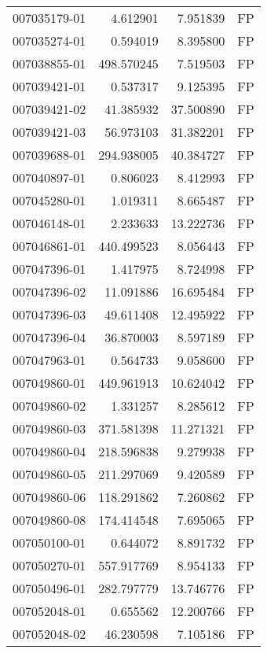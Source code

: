 \begin{tabular}{lrrl}
007035179-01 &    4.612901 &       7.951839 &   FP \\
007035274-01 &    0.594019 &       8.395800 &   FP \\
007038855-01 &  498.570245 &       7.519503 &   FP \\
007039421-01 &    0.537317 &       9.125395 &   FP \\
007039421-02 &   41.385932 &      37.500890 &   FP \\
007039421-03 &   56.973103 &      31.382201 &   FP \\
007039688-01 &  294.938005 &      40.384727 &   FP \\
007040897-01 &    0.806023 &       8.412993 &   FP \\
007045280-01 &    1.019311 &       8.665487 &   FP \\
007046148-01 &    2.233633 &      13.222736 &   FP \\
007046861-01 &  440.499523 &       8.056443 &   FP \\
007047396-01 &    1.417975 &       8.724998 &   FP \\
007047396-02 &   11.091886 &      16.695484 &   FP \\
007047396-03 &   49.611408 &      12.495922 &   FP \\
007047396-04 &   36.870003 &       8.597189 &   FP \\
007047963-01 &    0.564733 &       9.058600 &   FP \\
007049860-01 &  449.961913 &      10.624042 &   FP \\
007049860-02 &    1.331257 &       8.285612 &   FP \\
007049860-03 &  371.581398 &      11.271321 &   FP \\
007049860-04 &  218.596838 &       9.279938 &   FP \\
007049860-05 &  211.297069 &       9.420589 &   FP \\
007049860-06 &  118.291862 &       7.260862 &   FP \\
007049860-08 &  174.414548 &       7.695065 &   FP \\
007050100-01 &    0.644072 &       8.891732 &   FP \\
007050270-01 &  557.917769 &       8.954133 &   FP \\
007050496-01 &  282.797779 &      13.746776 &   FP \\
007052048-01 &    0.655562 &      12.200766 &   FP \\
007052048-02 &   46.230598 &       7.105186 &   FP \\

\end{tabular}
